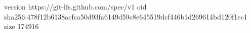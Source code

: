 version https://git-lfs.github.com/spec/v1
oid sha256:478f12b6138acfca50d93fa6149d59c8e645519dcf446b1d269614bd120f1ec1
size 174916
